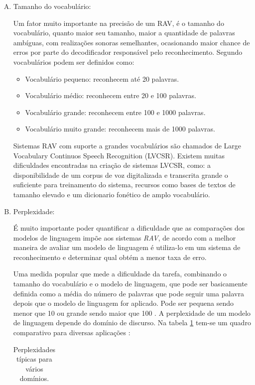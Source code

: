 \begin{enumerate}[A)]
\item Tamanho do vocabulário:

Um fator muito importante na precisão de um RAV, é o tamanho do vocabulário, quanto maior seu tamanho, maior a quantidade de palavras ambíguas, com realizações sonoras semelhantes, ocasionando maior chance de erros por parte do decodificador responsável pelo reconhecimento. Segundo \cite{RavIsolAnderson} vocabulários podem ser definidos como:

\begin{itemize}
\item Vocabulário pequeno: reconhecem até 20 palavras. 
\item Vocabulário médio: reconhecem entre 20 e 100 palavras. 
\item Vocabulário grande: reconhecem entre 100 e 1000 palavras. 
\item Vocabulário muito grande: reconhecem mais de 1000 palavras. 
\end{itemize}

Sistemas RAV com suporte a grandes vocabulários são chamados de Large Vocabulary Continuos Speech Recognition (LVCSR). Existem muitas dificuldades encontradas na criação de sistemas LVCSR, como: a disponibilidade de um corpus de voz digitalizada e transcrita grande o suficiente para treinamento do sistema, recursos como bases de textos de
tamanho elevado e um dicionario fonético de amplo vocabulário.

\item Perplexidade: 

É muito importante poder quantificar a dificuldade que as comparações dos modelos de linguagem impõe aos sistemas \textit{RAV}, de acordo com \cite{RavHmmCarlos} a melhor maneira de avaliar um modelo de linguagem é utiliza-lo em um sistema de reconhecimento e determinar qual obtém a menor taxa de erro.   

Uma medida popular que mede a dificuldade da tarefa, combinando o tamanho do vocabulário e o modelo de linguagem, que pode ser basicamente definida como a média do número de palavras que pode seguir uma palavra depois que o modelo de linguagem for aplicado. Pode ser pequena sendo menor que 10 ou grande sendo maior que 100 \cite{RavHmmCarlos}. A perplexidade de um modelo de linguagem depende do domínio de discurso. Na tabela \ref{tabPerp} tem-se um quadro comparativo para diversas aplicações \cite{SurveyCole} :

\begin{table}[H] %
\centering
\caption{Perplexidades típicas para vários domínios.} %
\label{tabPerp}
\begin{tabular}{cc} %


\end{tabular}
\end{table}
\end{enumerate}
